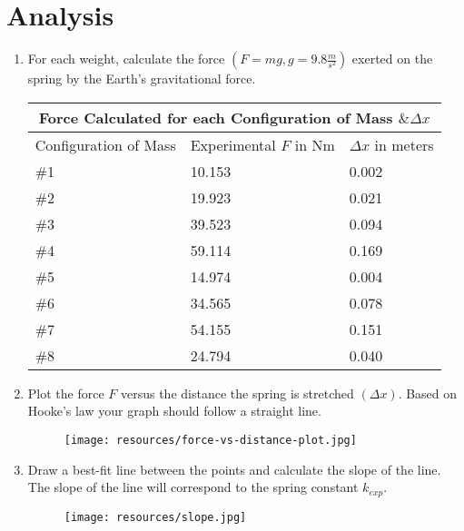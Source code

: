 \chapter{Analysis}

\begin{enumerate}
  \item For each weight, calculate the force $(F = mg, g = 9.8\frac{m}{s^2})$ exerted on
        the spring by the Earth's gravitational force.
	\begin{center}
  	\begin{tabular} { |p{2cm}|p{2cm}|p{2cm}| }
			\hline
  		\multicolumn{3}{|c|}{Force Calculated for each Configuration of Mass $\& \Delta x$} \\
			\hline 
			\centering Configuration of Mass & Experimental $F$ in Nm & $\Delta x$ in meters \\ 
			\hline
			\#1 & 10.153 & 0.002 \\
			\hline
			\#2 & 19.923 & 0.021 \\
			\hline
			\#3 & 39.523 & 0.094 \\
			\hline
			\#4 & 59.114 & 0.169 \\
			\hline
			\#5 & 14.974 & 0.004 \\
			\hline
			\#6 & 34.565 & 0.078 \\
			\hline
			\#7 & 54.155 & 0.151 \\
			\hline
			\#8 & 24.794 & 0.040 \\
			\hline
    \end{tabular}
	\end{center}

  \item Plot the force $F$ versus the distance the spring is stretched $(\Delta x)$.
        Based on Hooke's law your graph should follow a straight line.

			\begin{center}
				\begin{figure}[h!]
					\centerline{\texttt{[image: resources/force-vs-distance-plot.jpg]}}
				\end{figure}
			\end{center}

	\newpage

  \item Draw a best-fit line between the points and calculate the slope of the line.
        The slope of the line will correspond to the spring constant $k_{exp}$.

			\begin{center}
				\begin{figure}[h!]
					\centerline{\texttt{[image: resources/slope.jpg]}}
				\end{figure}
			\end{center}


\end{enumerate}
